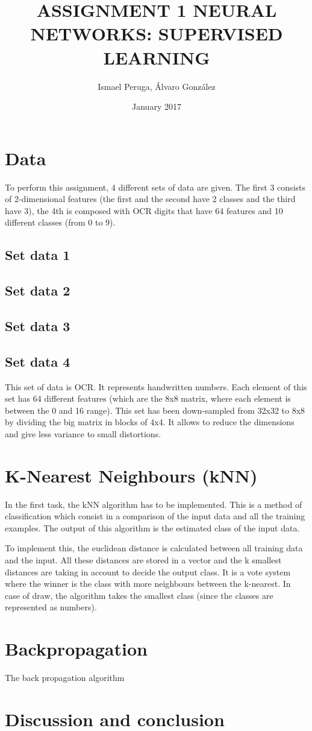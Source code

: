 \documentclass{article}
\title{ASSIGNMENT 1 NEURAL NETWORKS: SUPERVISED LEARNING}
\author{Ismael Peruga, Álvaro González}
\date{January 2017}
\begin{document}
\maketitle
\section{Data}
To perform this assignment, 4 different sets of data are given. The first 3 consists of 2-dimensional features (the first and the second have 2 classes and the third have 3), the 4th is composed with OCR digits that have 64 features and 10 different classes (from 0 to 9).

\subsection{Set data 1}

\subsection{Set data 2}

\subsection{Set data 3}

\subsection{Set data 4}
This set of data is OCR. It represents handwritten numbers. Each element of this set has 64 different features (which are the 8x8 matrix, where each element is between the 0 and 16 range). This set has been down-sampled from 32x32 to 8x8 by dividing the big matrix in blocks of 4x4. It allows to reduce the dimensions and give less variance to small distortions. 

\section{K-Nearest Neighbours (kNN)}
In the first task, the kNN algorithm has to be implemented. This is a method of classification which consist in a comparison of the input data and all the training examples. The output of this algorithm is the estimated class of the input data.

To implement this, the euclidean distance is calculated between all training data and the input. All these distances are stored in a vector and the k smallest distances are taking in account to decide the output class. It is a vote system where the winner is the class with more neighbours between the k-nearest. In case of draw, the algorithm takes the smallest class (since the classes are represented as numbers). %

\section{Backpropagation}
The back propagation algorithm 
\section{Discussion and conclusion}
\end{document}
